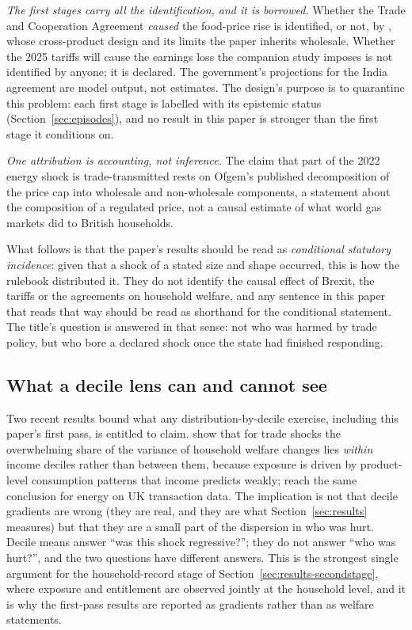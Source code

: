 \emph{The first stages carry all the identification, and it is
borrowed.} Whether the Trade and Cooperation Agreement \emph{caused}
the food-price rise is identified, or not, by \citet{bakker2026},
whose cross-product design and its limits the paper inherits wholesale.
Whether the 2025 tariffs will cause the earnings loss the companion
study imposes is not identified by anyone; it is declared. The
government's projections for the India agreement are model output, not
estimates. The design's purpose is to quarantine this problem: each
first stage is labelled with its epistemic status
(Section~\ref{sec:episodes}), and no result in this paper is stronger
than the first stage it conditions on.

\emph{One attribution is accounting, not inference.} The claim that
part of the 2022 energy shock is trade-transmitted rests on Ofgem's
published decomposition of the price cap into wholesale and non-wholesale
components, a statement about the composition of a regulated price, not
a causal estimate of what world gas markets did to British households.

What follows is that the paper's results should be read as
\emph{conditional statutory incidence}: given that a shock of a stated
size and shape occurred, this is how the rulebook distributed it. They
do not identify the causal effect of Brexit, the tariffs or the
agreements on household welfare, and any sentence in this paper that
reads that way should be read as shorthand for the conditional
statement. The title's question is answered in that sense: not who was
harmed by trade policy, but who bore a declared shock once the state had
finished responding.

\subsection{What a decile lens can and cannot see}\label{sec:framework-decile}

Two recent results bound what any distribution-by-decile exercise,
including this paper's first pass, is entitled to claim.
\citet{borusyakjaravel2024} show that for trade shocks the
overwhelming share of the variance of household welfare changes lies
\emph{within} income deciles rather than between them, because
exposure is driven by product-level consumption patterns that income
predicts weakly; \citet{levell2025} reach the same conclusion for
energy on UK transaction data. The implication is not that decile
gradients are wrong (they are real, and they are what
Section~\ref{sec:results} measures) but that they are a small part of
the dispersion in who was hurt. Decile means answer ``was this shock
regressive?''; they do not answer ``who was hurt?'', and the two
questions have different answers. This is the strongest single
argument for the household-record stage of
Section~\ref{sec:results-secondstage}, where exposure and entitlement are observed
jointly at the household level, and it is why the first-pass results
are reported as gradients rather than as welfare statements.

